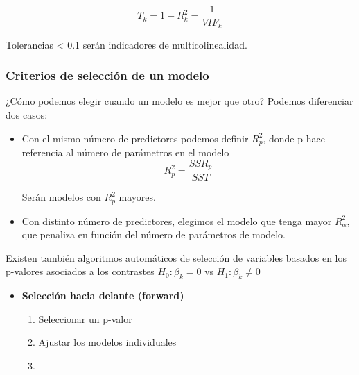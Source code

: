 $$
T_k=1-R^2_k=\frac{1}{VIF_k}
$$

Tolerancias < 0.1 serán indicadores de multicolinealidad.

\subsubsection{Criterios de selección de un modelo}

¿Cómo podemos elegir cuando un modelo es mejor que otro? Podemos diferenciar dos casos:

\begin{itemize}
    \item Con el mismo número de predictores podemos definir $R^2_p$, donde p hace referencia al número de parámetros en el modelo
    $$
    R^2_p=\frac{SSR_p}{SST}
    $$

    Serán modelos con $R^2_p$ mayores.

    \item Con distinto número de predictores, elegimos el modelo que tenga mayor $R^2_\alpha$, que penaliza en función del número de parámetros de modelo.

\end{itemize}

Existen también algoritmos automáticos de selección de variables basados en los p-valores asociados a los contrastes $H_0:\beta_k=0$ vs $H_1:\beta_k\neq0$  

\begin{itemize}
    \item \textbf{Selección hacia delante (forward)}\begin{enumerate}
        \item Seleccionar un p-valor
        \item Ajustar los modelos individuales
        \item 
    \end{enumerate}
\end{itemize}
